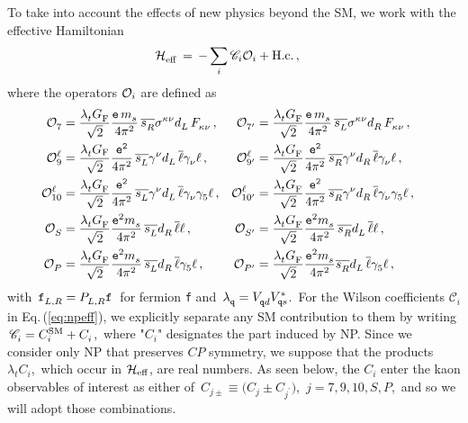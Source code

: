 \documentclass[amsmath,amssymb,aps,nofootinbib,prd,preprint,superscriptaddress,tightenlines,a4paper,bm]{revtex4-2}
\begin{document}
To take into account the effects of new physics beyond the SM, we work with the effective Hamiltonian
\begin{align}
{\cal H}_{\rm eff}^{} & \,=\, -\sum_i {\mathscr C}_i{\cal O}_i+ {\rm H.c.} \,, & \label{eq:npeff}
\end{align}
where the operators ${\cal O}_i$ are defined as
\begin{align}
{\cal O}_7^{} & = \frac{\lambda_t^{}G_{\rm F}^{}}{\sqrt2} \frac{{\tt e}\,m_s^{}}{4\pi^2}\, \overline{s_R^{}}\sigma^{\kappa\nu} d_L^{}\, F_{\kappa\nu}^{} \,, &
{\cal O}_{7^\prime}^{} & = \frac{\lambda_t^{}G_{\rm F}^{}}{\sqrt2} \frac{{\tt e}\, m_s^{}}{4\pi^2}\, \overline{s_L^{}}\sigma^{\kappa\nu} d_R^{}\, F_{\kappa\nu}^{} \,,
\nonumber \\
{\cal O}_9^\ell & = \frac{\lambda_t^{}G_{\rm F}}{\sqrt2} \frac{\tt e^2}{4\pi^2}\, \overline{s_L^{}}\gamma^\nu d_L^{}\, \overline\ell\gamma_\nu^{}\ell \,, &
{\cal O}_{9^\prime}^\ell & = \frac{\lambda_t^{}G_{\rm F}^{}}{\sqrt2}  \frac{\tt e^2}{4\pi^2}\, \overline{s_R^{}}\gamma^\nu d_R^{}\, \overline\ell\gamma_\nu^{}\ell \,, \nonumber \\
{\cal O}_{10}^\ell & = \frac{\lambda_t^{}G_{\rm F}^{}}{\sqrt2} \frac{\tt e^2}{4\pi^2}\, \overline{s_L^{}}\gamma^\nu d_L^{}\, \overline\ell \gamma_\nu^{} \gamma_5^{}\ell \,, &
{\cal O}_{10^\prime}^\ell & = \frac{\lambda_t^{}G_{\rm F}^{}}{\sqrt2}  \frac{\tt e^2}{4\pi^2}\, \overline{s_R^{}}\gamma^\nu d_R^{}\, \overline\ell\gamma_\nu^{} \gamma_5^{}\ell \,,
\nonumber \\
{\cal O}_S^{} & = \frac{\lambda_t^{}G_{\rm F}^{}}{\sqrt2} \frac{{\tt e}^2m_s^{}}{4\pi^2}\, \overline{s_L^{}} d_R^{}\, \overline\ell\ell \,, &
{\cal O}_{S^\prime}^{} & = \frac{\lambda_t^{}G_{\rm F}^{}}{\sqrt2} \frac{{\tt e}^2m_s^{}}{4\pi^2}\, \overline{s_R^{}}d_L^{}\, \overline\ell\ell \,,
\nonumber \\
{\cal O}_P^{} & = \frac{\lambda_t^{}G_{\rm F}^{}}{\sqrt2} \frac{{\tt e}^2m_s^{}}{4\pi^2}\, \overline{s_L^{}} d_R^{}\, \overline\ell \gamma_5^{}\ell \,, &
{\cal O}_{P^\prime}^{} & = \frac{\lambda_t^{}G_{\rm F}^{}}{\sqrt2} \frac{{\tt e}^2m_s^{}}{4\pi^2} \overline{s_R^{}}d_L^{}\, \overline\ell\gamma_5^{}\ell \,, & \label{eq:npdefs}
\end{align}
with \,$\textsl{\tt f}_{L,R}^{}=P_{L,R}^{}\textsl{\tt f}$\, for fermion {\tt f} and \,$\lambda_{\tt q}^{}=V_{{\tt q}d}^{}V_{{\tt q}s}^*$.\,
For the Wilson coefficients ${\mathscr C}_i^{}$ in Eq.\,(\ref{eq:npeff}), we explicitly separate any SM contribution to them by writing \,${\mathscr C}_i^{}=C_i^{\rm SM}+C_i^{}$,\, where "$C_i$" designates the part induced by NP.
Since we consider only NP that preserves $CP$ symmetry, we suppose that the products \,$\lambda_t^{}C_i^{}$,\, which occur in ${\cal H}_{\rm eff}$, are real numbers.
As seen below, the $C_i$ enter the kaon observables of interest as either of \,$C_{j\pm}\equiv\big(C_{j}\pm C_{j^\prime}\big)$,\, $j=7,9,10,S,P$,\, and so we will adopt those combinations.
\end{document}
